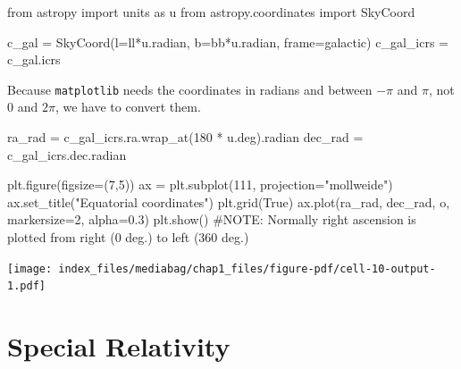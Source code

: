 \documentclass[
  letterpaper,
  DIV=11,
  numbers=noendperiod]{scrreprt}
\newenvironment{Shaded}{\begin{snugshade}}{\end{snugshade}}
\newcommand{\CommentTok}[1]{\textcolor[rgb]{0.37,0.37,0.37}{#1}}
\newcommand{\DecValTok}[1]{\textcolor[rgb]{0.68,0.00,0.00}{#1}}
\newcommand{\FloatTok}[1]{\textcolor[rgb]{0.68,0.00,0.00}{#1}}
\newcommand{\ImportTok}[1]{\textcolor[rgb]{0.00,0.46,0.62}{#1}}
\newcommand{\NormalTok}[1]{\textcolor[rgb]{0.00,0.23,0.31}{#1}}
\newcommand{\OperatorTok}[1]{\textcolor[rgb]{0.37,0.37,0.37}{#1}}
\newcommand{\StringTok}[1]{\textcolor[rgb]{0.13,0.47,0.30}{#1}}
\newcommand{\VariableTok}[1]{\textcolor[rgb]{0.07,0.07,0.07}{#1}}
\begin{document}
\begin{tcolorbox}[enhanced jigsaw, toprule=.15mm, colframe=quarto-callout-color-frame, bottomrule=.15mm, leftrule=.75mm, left=2mm, breakable, rightrule=.15mm, arc=.35mm, opacityback=0, colback=white]
\begin{Shaded}
\begin{Highlighting}[]
\ImportTok{from}\NormalTok{ astropy }\ImportTok{import}\NormalTok{ units }\ImportTok{as}\NormalTok{ u}
\ImportTok{from}\NormalTok{ astropy.coordinates }\ImportTok{import}\NormalTok{ SkyCoord}

\NormalTok{c\_gal }\OperatorTok{=}\NormalTok{ SkyCoord(l}\OperatorTok{=}\NormalTok{ll}\OperatorTok{*}\NormalTok{u.radian, b}\OperatorTok{=}\NormalTok{bb}\OperatorTok{*}\NormalTok{u.radian, frame}\OperatorTok{=}\StringTok{\textquotesingle{}galactic\textquotesingle{}}\NormalTok{)}
\NormalTok{c\_gal\_icrs }\OperatorTok{=}\NormalTok{ c\_gal.icrs}
\end{Highlighting}
\end{Shaded}

Because \texttt{matplotlib} needs the coordinates in radians and between
\(-\pi\) and \(\pi\), not 0 and \(2\pi\), we have to convert them.

\begin{Shaded}
\begin{Highlighting}[]
\NormalTok{ra\_rad }\OperatorTok{=}\NormalTok{ c\_gal\_icrs.ra.wrap\_at(}\DecValTok{180} \OperatorTok{*}\NormalTok{ u.deg).radian}
\NormalTok{dec\_rad }\OperatorTok{=}\NormalTok{ c\_gal\_icrs.dec.radian}

\NormalTok{plt.figure(figsize}\OperatorTok{=}\NormalTok{(}\DecValTok{7}\NormalTok{,}\DecValTok{5}\NormalTok{))}
\NormalTok{ax }\OperatorTok{=}\NormalTok{ plt.subplot(}\DecValTok{111}\NormalTok{, projection}\OperatorTok{=}\StringTok{"mollweide"}\NormalTok{)}
\NormalTok{ax.set\_title(}\StringTok{"Equatorial coordinates"}\NormalTok{)}
\NormalTok{plt.grid(}\VariableTok{True}\NormalTok{)}
\NormalTok{ax.plot(ra\_rad, dec\_rad, }\StringTok{\textquotesingle{}o\textquotesingle{}}\NormalTok{, markersize}\OperatorTok{=}\DecValTok{2}\NormalTok{, alpha}\OperatorTok{=}\FloatTok{0.3}\NormalTok{)}
\NormalTok{plt.show()}
\CommentTok{\#NOTE: Normally right ascension is plotted from right (0 deg.) to left (360 deg.)}
\end{Highlighting}
\end{Shaded}

\texttt{[image: index\_files/mediabag/chap1\_files/figure-pdf/cell-10-output-1.pdf]}

\end{tcolorbox}

\section{Special Relativity}\label{special-relativity}
\end{document}

